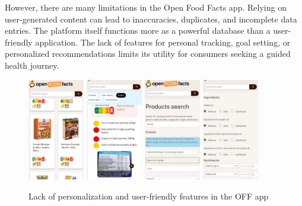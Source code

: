 However, there are many limitations in the Open Food Facts app. Relying on user-generated content can lead to inaccuracies, duplicates, and incomplete data entries. The platform itself functions more as a powerful database than a user-friendly application. The lack of features for personal tracking, goal setting, or personalized recommendations limits its utility for consumers seeking a guided health journey.

\begin{figure}[H]
    \centering
    \includegraphics[width=0.22\textwidth]{images/OFF-00.png}
    \includegraphics[width=0.22\textwidth]{images/OFF-01.png}
    \includegraphics[width=0.22\textwidth]{images/OFF-02.png}
    \includegraphics[width=0.22\textwidth]{images/OFF-03.png}
    \caption{Lack of personalization and user-friendly features in the OFF app}
    \label{fig:natilait_screenshots}
\end{figure}


